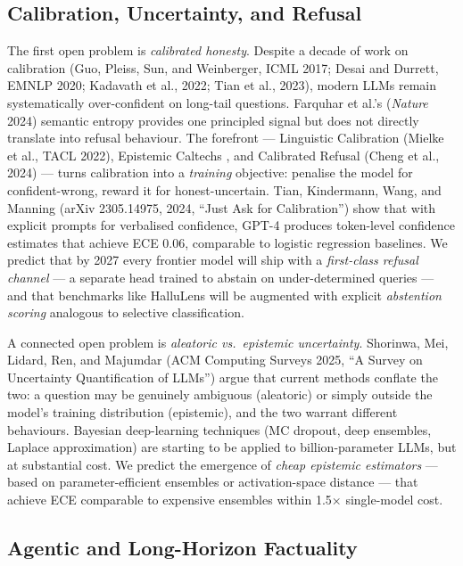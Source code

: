 \documentclass{article}
\begin{document}
\subsection{Calibration, Uncertainty, and Refusal}\label{calibration-uncertainty-and-refusal}

The first open problem is \emph{calibrated honesty}. Despite a decade of work on calibration (Guo, Pleiss, Sun, and Weinberger, ICML 2017; Desai and Durrett, EMNLP 2020; Kadavath et al., 2022; Tian et al., 2023), modern LLMs remain systematically over-confident on long-tail questions. Farquhar et al.'s (\emph{Nature} 2024) semantic entropy provides one principled signal but does not directly translate into refusal behaviour. The forefront --- Linguistic Calibration (Mielke et al., TACL 2022), Epistemic Caltechs \citep{lin2024towardstrustworthy}, and Calibrated Refusal (Cheng et al., 2024) --- turns calibration into a \emph{training} objective: penalise the model for confident-wrong, reward it for honest-uncertain. Tian, Kindermann, Wang, and Manning (arXiv 2305.14975, 2024, ``Just Ask for Calibration'') show that with explicit prompts for verbalised confidence, GPT-4 produces token-level confidence estimates that achieve ECE 0.06, comparable to logistic regression baselines. We predict that by 2027 every frontier model will ship with a \emph{first-class refusal channel} --- a separate head trained to abstain on under-determined queries --- and that benchmarks like HalluLens will be augmented with explicit \emph{abstention scoring} analogous to selective classification.

A connected open problem is \emph{aleatoric vs.~epistemic uncertainty}. Shorinwa, Mei, Lidard, Ren, and Majumdar (ACM Computing Surveys 2025, ``A Survey on Uncertainty Quantification of LLMs'') argue that current methods conflate the two: a question may be genuinely ambiguous (aleatoric) or simply outside the model's training distribution (epistemic), and the two warrant different behaviours. Bayesian deep-learning techniques (MC dropout, deep ensembles, Laplace approximation) are starting to be applied to billion-parameter LLMs, but at substantial cost. We predict the emergence of \emph{cheap epistemic estimators} --- based on parameter-efficient ensembles or activation-space distance --- that achieve ECE comparable to expensive ensembles within 1.5× single-model cost.

\subsection{Agentic and Long-Horizon Factuality}\label{agentic-and-long-horizon-factuality}
\end{document}
